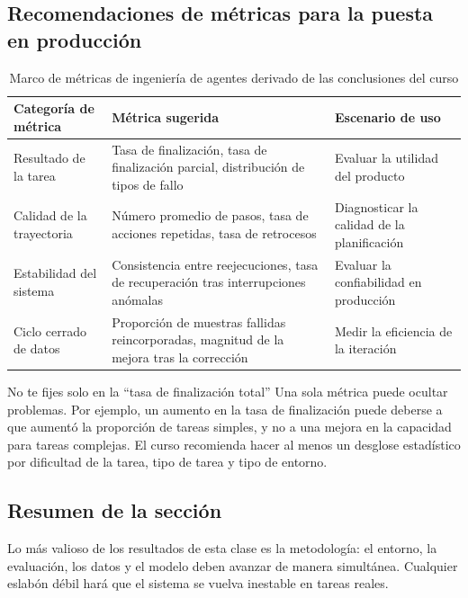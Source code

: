 \subsection{Recomendaciones de métricas para la puesta en producción}
\begin{table}[H]
\centering
\begin{tabular}{p{3.2cm}p{5.0cm}p{2.8cm}}
\toprule
\textbf{Categoría de métrica} & \textbf{Métrica sugerida} & \textbf{Escenario de uso} \\
\midrule
Resultado de la tarea & Tasa de finalización, tasa de finalización parcial, distribución de tipos de fallo & Evaluar la utilidad del producto \\
Calidad de la trayectoria & Número promedio de pasos, tasa de acciones repetidas, tasa de retrocesos & Diagnosticar la calidad de la planificación \\
Estabilidad del sistema & Consistencia entre reejecuciones, tasa de recuperación tras interrupciones anómalas & Evaluar la confiabilidad en producción \\
Ciclo cerrado de datos & Proporción de muestras fallidas reincorporadas, magnitud de la mejora tras la corrección & Medir la eficiencia de la iteración \\
\bottomrule
\end{tabular}
\caption{Marco de métricas de ingeniería de agentes derivado de las conclusiones del curso}
\end{table}

\begin{warningbox}{No te fijes solo en la ``tasa de finalización total''}
Una sola métrica puede ocultar problemas. Por ejemplo, un aumento en la tasa de finalización puede deberse a que aumentó la proporción de tareas simples, y no a una mejora en la capacidad para tareas complejas. El curso recomienda hacer al menos un desglose estadístico por dificultad de la tarea, tipo de tarea y tipo de entorno.
\end{warningbox}

\subsection{Resumen de la sección}
Lo más valioso de los resultados de esta clase es la metodología: el entorno, la evaluación, los datos y el modelo deben avanzar de manera simultánea. Cualquier eslabón débil hará que el sistema se vuelva inestable en tareas reales.
